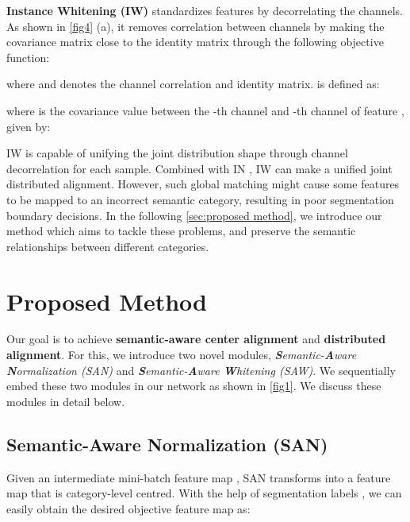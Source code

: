 \documentclass[10pt,twocolumn,letterpaper]{article}
\begin{document}
\textbf{Instance Whitening (IW)} standardizes features by decorrelating the channels. As shown in \cref{fig4} (a), it removes correlation between channels by making the covariance matrix close to the identity matrix through the following objective function:
\vspace{-3mm}

where  and  denotes the channel correlation and identity matrix.  is defined as:
\vspace{1mm}
\begin{footnotesize} 

\end{footnotesize}
\vspace{1mm}
where  is the covariance value between the -th channel and -th channel of feature , given by:
\begin{footnotesize}

\end{footnotesize} 

IW \cite{li2017universal} is capable of unifying the joint distribution shape through channel decorrelation for each sample.
Combined with IN \cite{ulyanov2017improved}, IW can make a unified joint distributed alignment. However, such global matching might cause some features to be mapped to an incorrect semantic category, resulting in poor segmentation boundary decisions. In the following \cref{sec:proposed method}, we introduce our method which aims to tackle these problems, and preserve the semantic relationships between different categories.













\section{Proposed Method \label{sec:proposed method}}

Our goal is to achieve \textbf{semantic-aware center alignment} and \textbf{distributed alignment}. For this, we introduce two novel modules, \textit{\textbf{S}emantic-\textbf{A}ware \textbf{N}ormalization (SAN)} and \textit{\textbf{S}emantic-\textbf{A}ware \textbf{W}hitening (SAW)}. We sequentially embed these two modules in our network as shown in \cref{fig1}. We discuss these modules in detail below.



\subsection{Semantic-Aware Normalization (SAN) \label{subsec:Spatial Feature Constraint (SFC)}}
Given an intermediate mini-batch feature map , SAN transforms  into a feature map that is category-level centred. With the help of segmentation labels , we can easily obtain the desired objective feature map  as:
\vspace{-2mm}
\end{document}
